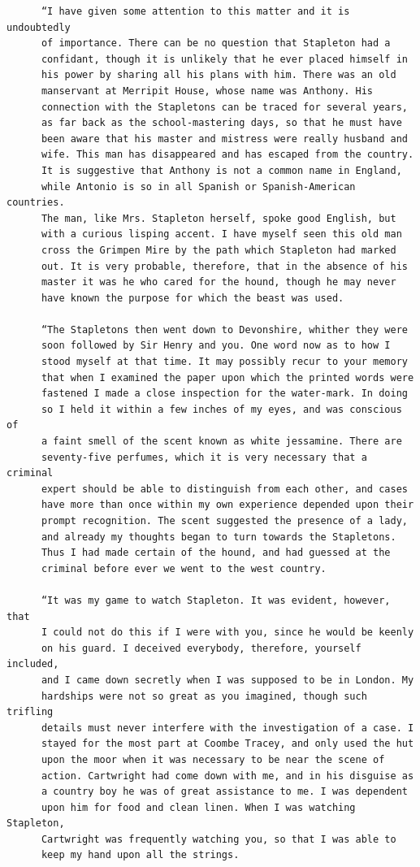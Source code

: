 \documentclass{article}
\begin{document}
\begin{verbatim}
      “I have given some attention to this matter and it is undoubtedly
      of importance. There can be no question that Stapleton had a
      confidant, though it is unlikely that he ever placed himself in
      his power by sharing all his plans with him. There was an old
      manservant at Merripit House, whose name was Anthony. His
      connection with the Stapletons can be traced for several years,
      as far back as the school-mastering days, so that he must have
      been aware that his master and mistress were really husband and
      wife. This man has disappeared and has escaped from the country.
      It is suggestive that Anthony is not a common name in England,
      while Antonio is so in all Spanish or Spanish-American countries.
      The man, like Mrs. Stapleton herself, spoke good English, but
      with a curious lisping accent. I have myself seen this old man
      cross the Grimpen Mire by the path which Stapleton had marked
      out. It is very probable, therefore, that in the absence of his
      master it was he who cared for the hound, though he may never
      have known the purpose for which the beast was used.

      “The Stapletons then went down to Devonshire, whither they were
      soon followed by Sir Henry and you. One word now as to how I
      stood myself at that time. It may possibly recur to your memory
      that when I examined the paper upon which the printed words were
      fastened I made a close inspection for the water-mark. In doing
      so I held it within a few inches of my eyes, and was conscious of
      a faint smell of the scent known as white jessamine. There are
      seventy-five perfumes, which it is very necessary that a criminal
      expert should be able to distinguish from each other, and cases
      have more than once within my own experience depended upon their
      prompt recognition. The scent suggested the presence of a lady,
      and already my thoughts began to turn towards the Stapletons.
      Thus I had made certain of the hound, and had guessed at the
      criminal before ever we went to the west country.

      “It was my game to watch Stapleton. It was evident, however, that
      I could not do this if I were with you, since he would be keenly
      on his guard. I deceived everybody, therefore, yourself included,
      and I came down secretly when I was supposed to be in London. My
      hardships were not so great as you imagined, though such trifling
      details must never interfere with the investigation of a case. I
      stayed for the most part at Coombe Tracey, and only used the hut
      upon the moor when it was necessary to be near the scene of
      action. Cartwright had come down with me, and in his disguise as
      a country boy he was of great assistance to me. I was dependent
      upon him for food and clean linen. When I was watching Stapleton,
      Cartwright was frequently watching you, so that I was able to
      keep my hand upon all the strings.


\end{verbatim}
\end{document}

